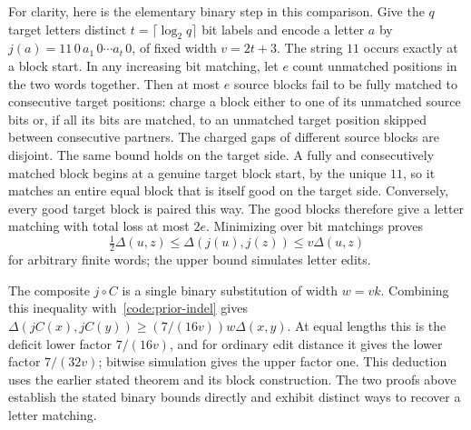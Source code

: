 For clarity, here is the elementary binary step in this comparison.
Give the $q$ target letters distinct $t=\lceil\log_2q\rceil$ bit labels and
encode a letter $a$ by
$j(a)=11\,0\,a_1\,0\cdots a_t\,0$, of fixed width $v=2t+3$.
The string $11$ occurs exactly at a block start. In any increasing bit
matching, let $e$ count unmatched positions in the two words together.
Then at most $e$ source blocks fail to
be fully matched to consecutive target positions: charge a block either
to one of its unmatched source bits or, if all its bits are matched, to
an unmatched target position skipped between consecutive partners. The
charged gaps of different source blocks are disjoint. The same bound holds
on the target side. A fully and consecutively matched block begins at a
genuine target block start, by the unique $11$, so it matches an entire
equal block that is itself good on the target side. Conversely, every good
target block is paired this way. The good blocks therefore give a letter matching with total loss at most
$2e$. Minimizing over bit matchings proves
\[
 \tfrac12\Delta(u,z)\leq\Delta(j(u),j(z))\leq v\Delta(u,z)
\]
for arbitrary finite words; the upper bound simulates letter edits.

The composite $j\circ C$ is a single binary substitution of width $w=vk$.
Combining this inequality with~\eqref{code:prior-indel} gives
$\Delta(jC(x),jC(y))\geq(7/(16v))w\Delta(x,y)$. At equal lengths this is
the deficit lower factor $7/(16v)$, and for ordinary edit distance it gives
the lower factor $7/(32v)$; bitwise simulation gives the upper factor one.
This deduction uses the earlier stated theorem and its block construction.
The two proofs above establish the stated binary bounds directly and exhibit
distinct ways to recover a letter matching.
